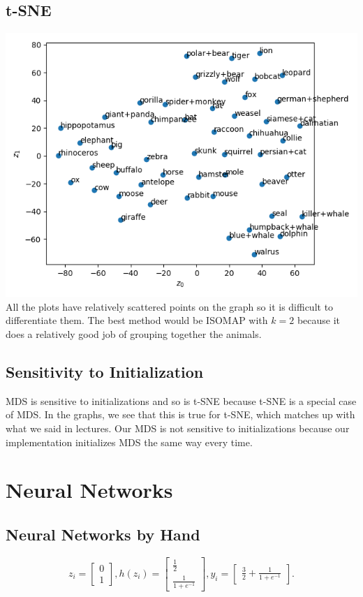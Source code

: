 \documentclass{article}
\newcommand{\mat}[1]{\begin{bmatrix}#1\end{bmatrix}}
\begin{document}
\subsection{t-SNE}

\includegraphics[scale=0.5]{TSNE.png}\\
All the plots have relatively scattered points on the graph so it is difficult to differentiate them. The best method would
be ISOMAP with $k=2$ because it does a relatively good job of grouping together the animals.

\subsection{Sensitivity to Initialization}

MDS is sensitive to initializations and so is t-SNE because t-SNE is a special case of MDS. In the graphs, we see
that this is true for t-SNE, which matches up with what we said in lectures. Our MDS is not sensitive to initializations
because our implementation initializes MDS the same way every time. 

\section{Neural Networks}

\subsection{Neural Networks by Hand}

$$
z_i = \mat{0 \\1}, h(z_i) = \mat{\frac12 \\\frac{1}{1+e^{-1}}}, y_i= \mat{\frac32 + \frac{1}{1+e^{-1}}}.
$$
\end{document}
